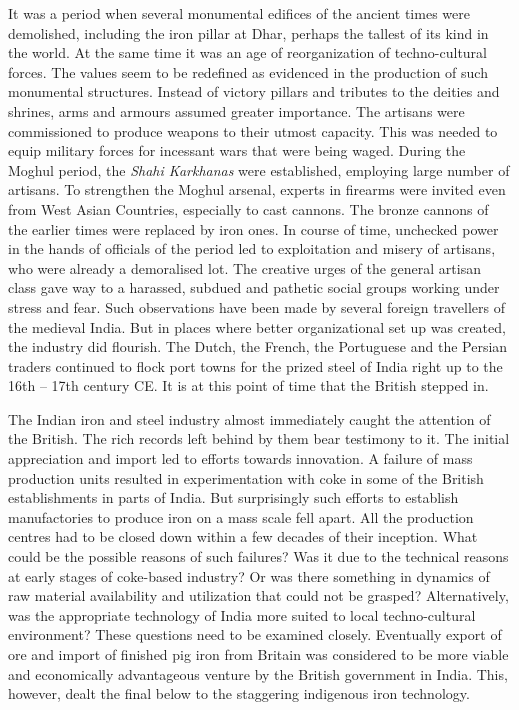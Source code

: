 It was a period when several monumental edifices of the ancient times were demolished, including the iron pillar at Dhar, perhaps the tallest of its kind in the world. At the same time it was an age of reorganization of techno-cultural forces. The values seem to be redefined as evidenced in the production of such monumental structures. Instead of victory pillars and tributes to the deities and shrines, arms and armours assumed greater importance. The artisans were commissioned to produce weapons to their utmost capacity. This was needed to equip military forces for incessant wars that were being waged. During the Moghul period, the \textit{Shahi Karkhanas} were established, employing large number of artisans. To strengthen the Moghul arsenal, experts in firearms were invited even from West Asian Countries, especially to cast cannons. The bronze cannons of the earlier times were replaced by iron ones. In course of time, unchecked power in the hands of officials of the period led to exploitation and misery of artisans, who were already a demoralised lot. The creative urges of the general artisan class gave way to a harassed, subdued and pathetic social groups working under stress and fear. Such observations have been made by several foreign travellers of the medieval India. But in places where better organizational set up was created, the industry did flourish. The Dutch, the French, the Portuguese and the Persian traders continued to flock port towns for the prized steel of India right up to the 16th – 17th century CE. It is at this point of time that the British stepped in.

The Indian iron and steel industry almost immediately caught the attention of the British. The rich records left behind by them bear testimony to it. The initial appreciation and import led to efforts towards innovation. A failure of mass production units resulted in experimentation with coke in some of the British establishments in parts of India. But surprisingly such efforts to establish manufactories to produce iron on a mass scale fell apart. All the production centres had to be closed down within a few decades of their inception. What could be the possible reasons of such failures? Was it due to the technical reasons at early stages of coke-based industry? Or was there something in dynamics of raw material availability and utilization that could not be grasped? Alternatively, was the appropriate technology of India more suited to local techno-cultural environment? These questions need to be examined closely. Eventually export of ore and import of finished pig iron from Britain was considered to be more viable and economically advantageous venture by the British government in India. This, however, dealt the final below to the staggering indigenous iron technology.


